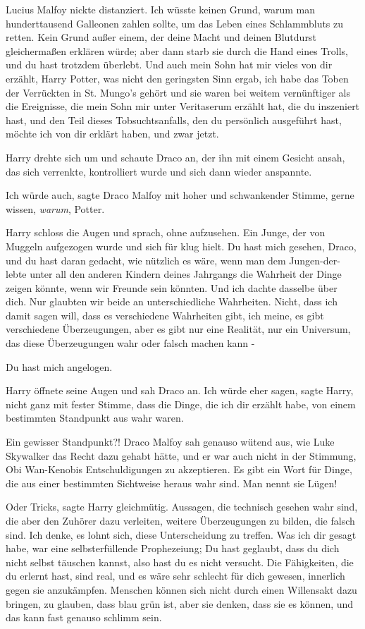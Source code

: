 Lucius Malfoy nickte distanziert. \glqq{}Ich wüsste keinen Grund, warum man
hunderttausend Galleonen zahlen sollte, um das Leben eines Schlammbluts zu
retten. Kein Grund außer einem, der deine Macht und deinen Blutdurst
gleichermaßen erklären würde; aber dann starb sie durch die Hand eines Trolls,
und du hast trotzdem überlebt. Und auch mein Sohn hat mir vieles von dir
erzählt, Harry Potter, was nicht den geringsten Sinn ergab, ich habe das Toben
der Verrückten in St. Mungo's gehört und sie waren bei weitem vernünftiger als
die Ereignisse, die mein Sohn mir unter Veritaserum erzählt hat, die du
inszeniert hast, und den Teil dieses Tobsuchtsanfalls, den du persönlich
ausgeführt hast, möchte ich von dir erklärt haben, und zwar jetzt.\grqq{}

Harry drehte sich um und schaute Draco an, der ihn mit einem Gesicht ansah, das
sich verrenkte, kontrolliert wurde und sich dann wieder anspannte.

\glqq{}Ich würde auch\grqq{}, sagte Draco Malfoy mit hoher und schwankender
Stimme, \glqq{}gerne wissen, \emph{warum}, Potter.\grqq{}

Harry schloss die Augen und sprach, ohne aufzusehen. \glqq{}Ein Junge, der von
Muggeln aufgezogen wurde und sich für klug hielt. Du hast mich gesehen, Draco,
und du hast daran gedacht, wie nützlich es wäre, wenn man dem Jungen-der-lebte
unter all den anderen Kindern deines Jahrgangs die Wahrheit der Dinge zeigen
könnte, wenn wir Freunde sein könnten. Und ich dachte dasselbe über dich. Nur
glaubten wir beide an unterschiedliche Wahrheiten. Nicht, dass ich damit sagen
will, dass es verschiedene Wahrheiten gibt, ich meine, es gibt verschiedene
Überzeugungen, aber es gibt nur eine Realität, nur ein Universum, das diese
Überzeugungen wahr oder falsch machen kann -\grqq{}

\glqq{}Du hast mich angelogen.\grqq{}

Harry öffnete seine Augen und sah Draco an. \glqq{}Ich würde eher sagen\grqq{},
sagte Harry, nicht ganz mit fester Stimme, \glqq{}dass die Dinge, die ich dir
erzählt habe, von einem bestimmten Standpunkt aus wahr waren.\grqq{}

\glqq{}Ein gewisser Standpunkt?!\grqq{} Draco Malfoy sah genauso wütend aus, wie
Luke Skywalker das Recht dazu gehabt hätte, und er war auch nicht in der
Stimmung, Obi Wan-Kenobis Entschuldigungen zu akzeptieren. \glqq{}Es gibt ein
Wort für Dinge, die aus einer bestimmten Sichtweise heraus wahr sind. Man nennt
sie Lügen!\grqq{}

\glqq{}Oder Tricks\grqq{}, sagte Harry gleichmütig. \glqq{}Aussagen, die technisch
gesehen wahr sind, die aber den Zuhörer dazu verleiten, weitere Überzeugungen zu
bilden, die falsch sind. Ich denke, es lohnt sich, diese Unterscheidung zu
treffen. Was ich dir gesagt habe, war eine selbsterfüllende Prophezeiung; Du
hast geglaubt, dass du dich nicht selbst täuschen kannst, also hast du es nicht
versucht. Die Fähigkeiten, die du erlernt hast, sind real, und es wäre sehr
schlecht für dich gewesen, innerlich gegen sie anzukämpfen. Menschen können sich
nicht durch einen Willensakt dazu bringen, zu glauben, dass blau grün ist, aber
sie denken, dass sie es können, und das kann fast genauso schlimm sein.\grqq{}

